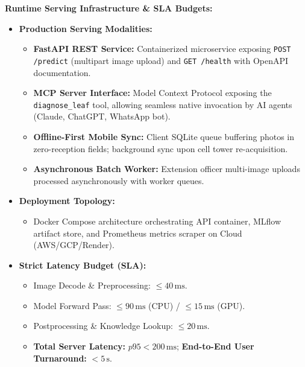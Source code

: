 \documentclass[8pt]{article}
\begin{document}
\begin{minipage}[t]{0.327\linewidth}%
  \begin{tcolorbox}[
    canvasbox,
    colback=bgModel,
    colframe=headModel,
    title={8. MAKING PREDICTIONS (SERVING)},
    boxed title style={colback=headModel},
    height=68mm
  ]
  \fontsize{7.2pt}{8.8pt}\selectfont
  \textbf{Runtime Serving Infrastructure \& SLA Budgets:}
  \vspace{1mm}
  \begin{itemize}
    \item \textbf{Production Serving Modalities:}
      \begin{itemize}
        \item \textbf{FastAPI REST Service:} Containerized microservice exposing \texttt{POST /predict} (multipart image upload) and \texttt{GET /health} with OpenAPI documentation.
        \item \textbf{MCP Server Interface:} Model Context Protocol exposing the \texttt{diagnose\_leaf} tool, allowing seamless native invocation by AI agents (Claude, ChatGPT, WhatsApp bot).
        \item \textbf{Offline-First Mobile Sync:} Client SQLite queue buffering photos in zero-reception fields; background sync upon cell tower re-acquisition.
        \item \textbf{Asynchronous Batch Worker:} Extension officer multi-image uploads processed asynchronously with worker queues.
      \end{itemize}
    \item \textbf{Deployment Topology:}
      \begin{itemize}
        \item Docker Compose architecture orchestrating API container, MLflow artifact store, and Prometheus metrics scraper on Cloud (AWS/GCP/Render).
      \end{itemize}
    \item \textbf{Strict Latency Budget (SLA):}
      \begin{itemize}
        \item Image Decode \& Preprocessing: $\le 40\,\text{ms}$.
        \item Model Forward Pass: $\le 90\,\text{ms}$ (CPU) / $\le 15\,\text{ms}$ (GPU).
        \item Postprocessing \& Knowledge Lookup: $\le 20\,\text{ms}$.
        \item \textbf{Total Server Latency:} \textbf{$p95 < 200\,\text{ms}$}; \textbf{End-to-End User Turnaround:} \textbf{$< 5\,\text{s}$}.
      \end{itemize}
  \end{itemize}
  \end{tcolorbox}%
\end{minipage}\hfill%
\end{document}
